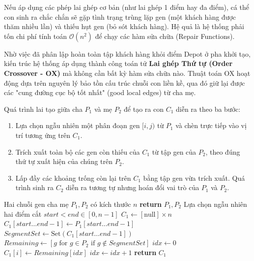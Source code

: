 \documentclass[12pt,a4paper]{article}
\numberwithin{figure}{subsection}
\newcounter{breakablealgocounter}
\newenvironment{breakablealgorithm}[1]
{
    \refstepcounter{breakablealgocounter}
    \begin{tcolorbox}[
        breakable,
        enhanced,
        colback=white,
        colframe=black!55,
        sharp corners,
        boxrule=0.5pt,
        left=2mm,
        right=2mm,
        top=1mm,
        bottom=1mm,
        title={Algorithm \thebreakablealgocounter. #1},
        fonttitle=\bfseries
    ]
}
{
    \end{tcolorbox}
}
\begin{document}
Nếu áp dụng các phép lai ghép cơ bản (như lai ghép 1 điểm hay đa điểm), cá thể con sinh ra chắc chắn sẽ gặp tình trạng trùng lặp gen (một khách hàng được thăm nhiều lần) và thiếu hụt gen (bỏ sót khách hàng). Hệ quả là hệ thống phải tốn chi phí tính toán $\mathcal{O}(n^2)$ để chạy các hàm sửa chữa (Repair Functions).

Nhờ việc đã phân lập hoàn toàn tập khách hàng khỏi điểm Depot ở pha khởi tạo, kiến trúc hệ thống áp dụng thành công toán tử \textbf{Lai ghép Thứ tự (Order Crossover - OX)} mà không cần bất kỳ hàm sửa chữa nào. Thuật toán OX hoạt động dựa trên nguyên lý bảo tồn cấu trúc chuỗi con liền kề, qua đó giữ lại được các "cung đường cục bộ tốt nhất" (good local edges) từ cha mẹ. 

Quá trình lai tạo giữa cha $P_1$ và mẹ $P_2$ để tạo ra con $C_1$ diễn ra theo ba bước:
\begin{enumerate}
    \item Lựa chọn ngẫu nhiên một phân đoạn gen $[i, j)$ từ $P_1$ và chèn trực tiếp vào vị trí tương ứng trên $C_1$.
    \item Trích xuất toàn bộ các gen còn thiếu của $C_1$ từ tập gen của $P_2$, theo đúng thứ tự xuất hiện của chúng trên $P_2$.
    \item Lấp đầy các khoảng trống còn lại trên $C_1$ bằng tập gen vừa trích xuất. Quá trình sinh ra $C_2$ diễn ra tương tự nhưng hoán đổi vai trò của $P_1$ và $P_2$.
\end{enumerate}

\begin{breakablealgorithm}{Thuật toán Lai ghép Thứ tự (Order Crossover - OX)}
\label{alg:ox_crossover}
\begin{algorithmic}[1]
\Require Hai chuỗi gen cha mẹ $P_1, P_2$ có kích thước $n$
    \State \textbf{return} $P_1, P_2$
\EndIf
\State Lựa chọn ngẫu nhiên hai điểm cắt $start < end \in [0, n-1]$
\State $C_1 \gets [\text{null}] \times n$
\State $C_1[start \dots end-1] \gets P_1[start \dots end-1]$ 
\State $SegmentSet \gets \text{Set}(C_1[start \dots end-1])$
\State $Remaining \gets [g \text{ for } g \in P_2 \text{ if } g \notin SegmentSet]$ 
\State $idx \gets 0$
        \State $C_1[i] \gets Remaining[idx]$ 
        \State $idx \gets idx + 1$
    \EndIf
\EndFor
\State \textbf{return} $C_1$
\end{algorithmic}
\end{breakablealgorithm}
\end{document}
